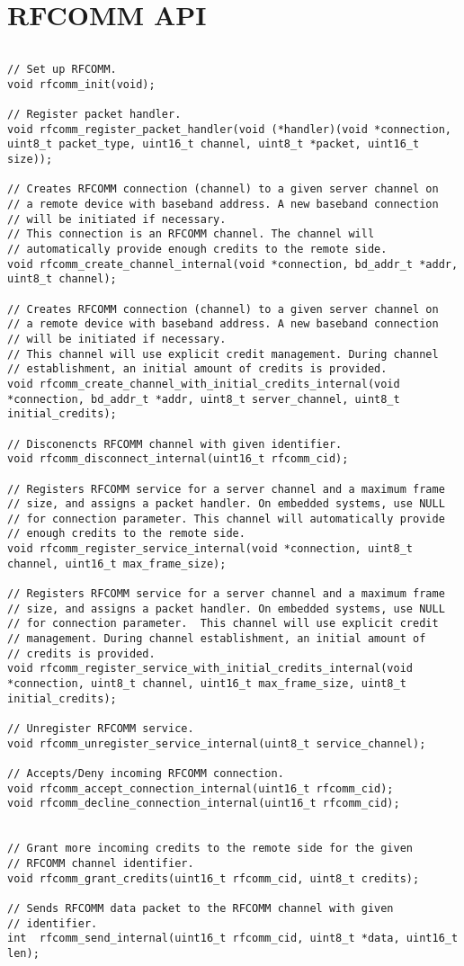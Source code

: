 \section{RFCOMM API}
\label{appendix:api_rfcomm}
$ $
\begin{lstlisting}
// Set up RFCOMM.
void rfcomm_init(void);

// Register packet handler.
void rfcomm_register_packet_handler(void (*handler)(void *connection, uint8_t packet_type, uint16_t channel, uint8_t *packet, uint16_t size));

// Creates RFCOMM connection (channel) to a given server channel on 
// a remote device with baseband address. A new baseband connection 
// will be initiated if necessary.
// This connection is an RFCOMM channel. The channel will 
// automatically provide enough credits to the remote side.
void rfcomm_create_channel_internal(void *connection, bd_addr_t *addr, uint8_t channel);

// Creates RFCOMM connection (channel) to a given server channel on
// a remote device with baseband address. A new baseband connection
// will be initiated if necessary. 
// This channel will use explicit credit management. During channel 
// establishment, an initial amount of credits is provided.
void rfcomm_create_channel_with_initial_credits_internal(void *connection, bd_addr_t *addr, uint8_t server_channel, uint8_t initial_credits);

// Disconencts RFCOMM channel with given identifier. 
void rfcomm_disconnect_internal(uint16_t rfcomm_cid);

// Registers RFCOMM service for a server channel and a maximum frame 
// size, and assigns a packet handler. On embedded systems, use NULL 
// for connection parameter. This channel will automatically provide 
// enough credits to the remote side.
void rfcomm_register_service_internal(void *connection, uint8_t channel, uint16_t max_frame_size);

// Registers RFCOMM service for a server channel and a maximum frame
// size, and assigns a packet handler. On embedded systems, use NULL 
// for connection parameter.  This channel will use explicit credit
// management. During channel establishment, an initial amount of 
// credits is provided.
void rfcomm_register_service_with_initial_credits_internal(void *connection, uint8_t channel, uint16_t max_frame_size, uint8_t initial_credits);

// Unregister RFCOMM service.
void rfcomm_unregister_service_internal(uint8_t service_channel);

// Accepts/Deny incoming RFCOMM connection.
void rfcomm_accept_connection_internal(uint16_t rfcomm_cid);
void rfcomm_decline_connection_internal(uint16_t rfcomm_cid);


// Grant more incoming credits to the remote side for the given 
// RFCOMM channel identifier.
void rfcomm_grant_credits(uint16_t rfcomm_cid, uint8_t credits);

// Sends RFCOMM data packet to the RFCOMM channel with given
// identifier.
int  rfcomm_send_internal(uint16_t rfcomm_cid, uint8_t *data, uint16_t len); 
\end{lstlisting}
\pagebreak
